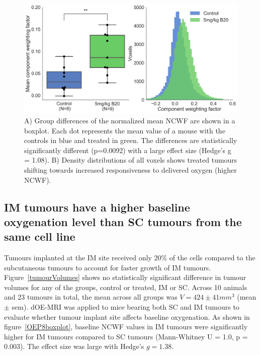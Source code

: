 \begin{figure}[htbp]
   \centering
   \includegraphics[width=\textwidth]{oemri_thesis3/oemri_thesis3-images/2_aarts3_b20_boxplot_dOEMRI.png} %
   \caption{A) Group differences of the normalized mean \acs{NCWF} are shown in a boxplot.
   Each dot represents the mean value of a mouse with the controls in blue and treated in green.
   The differences are statistically significantly different (p=0.0092) with a large effect size (Hedge's g = 1.08).
   B) Density distributions of all voxels shows treated tumours shifting towards increased responsiveness to delivered oxygen (higher \acs{NCWF}).}
   \label{aarts3boxplot}
\end{figure}

\subsection{\acs{IM} tumours have a higher baseline oxygenation level than \acs{SC} tumours from the same cell line}

Tumours implanted at the \acs{IM} site received only 20\% of the cells compared to the subcutaneous tumours to account for faster growth of \acs{IM} tumours.
Figure~\ref{tumourVolumes} shows no statistically significant difference in tumour volumes for any of the groups, control or treated, \acs{IM} or \acs{SC}. 
Across 10 animals and 23 tumours in total, the mean across all groups was $V = 424 \pm 41 mm^3$ (mean $\pm$ sem). 
\ac{dOE-MRI} was applied to mice bearing both \acs{SC} and \acs{IM} tumours to evaluate whether tumour implant site affects baseline oxygenation. 
As shown in figure~\ref{OEP8boxplot}, baseline \acs{NCWF} values in \acs{IM} tumours were significantly higher for \acs{IM} tumours compared to \acs{SC} tumours (Mann-Whitney U = 1.0, p = 0.003).
The effect size was large with Hedge's ${g=1.38}$.

